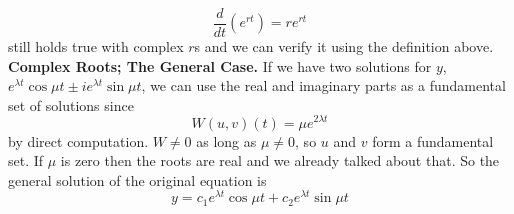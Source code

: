     \begin{equation*}
        \frac{d}{dt}(e^{rt}) = re^{rt}
    \end{equation*}
    still holds true with complex $r$s and we can verify it using the definition above.
    \newline
    \textbf{Complex Roots; The General Case.} If we have two solutions for $y$, $e^{\lambda t}\cos \mu t \pm ie^{\lambda t}\sin \mu t$, we can use the real and imaginary parts as a fundamental set of solutions since
    \begin{equation*}
        W(u, v)(t) = \mu e^{2\lambda t}
    \end{equation*}
    by direct computation. $W \neq 0$ as long as $\mu \neq 0$, so $u$ and $v$ form a fundamental set. If $\mu$ is zero then the roots are real and we already talked about that. So the general solution of the original equation is
    \begin{equation*}
        y = c_1e^{\lambda t}\cos \mu t + c_2 e^{\lambda t} \sin \mu t
    \end{equation*}
    
    